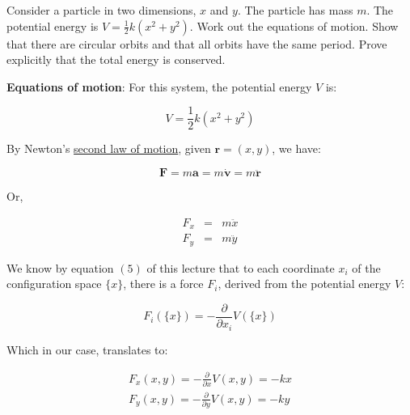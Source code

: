 \documentclass[solutions.tex]{subfiles}
\begin{document}
\maketitle
\begin{exercise}
Consider a particle in two dimensions,
$x$ and $y$. The particle has mass $m$. The potential energy
is $V=\frac{1}{2}k(x^2+y^2)$. Work out the equations of motion.
Show that there are circular orbits and that all orbits have
the same period. Prove explicitly that the total energy is
conserved.
\end{exercise}

\hfill \break

\textbf{Equations of motion}: For this system, the potential
energy $V$ is:

\begin{equation}
\label{eqn:L05E02:epot}
V = \frac12k(x^2+y^2)
\end{equation}

By Newton's \href{https://en.wikipedia.org/wiki/Newton\%27s\_laws\_of\_motion\#Second}{
second law of motion}, given $\bm{r}=(x,y)$, we have:

\begin{equation}
	\bm{F} = m\bm{a} = m\dot{\bm{v}} = m\ddot{\bm{r}}
\end{equation}

Or,

\begin{equation}
	\label{eqn:L05E02:n2l}
	\begin{aligned}
		F_x &=& m\ddot{x} \\
		F_y &=& m\ddot{y}
	\end{aligned}
\end{equation}

We know by equation $(5)$ of this lecture that to each coordinate
$x_i$ of the configuration space $\{x\}$, there is a force $F_i$,
derived from the potential energy $V$:

\begin{equation}
	F_i(\{x\}) = -\frac{\partial}{\partial x_i}V(\{x\})
\end{equation}

Which in our case, translates to:

\begin{equation}
	\label{eqn:L05E02:fp}
	\begin{aligned}
		F_x(x, y) = -\frac{\partial}{\partial x}V(x, y) = -kx \\
		F_y(x, y) = -\frac{\partial}{\partial y}V(x, y) = -ky
	\end{aligned}
\end{equation}
\end{document}
